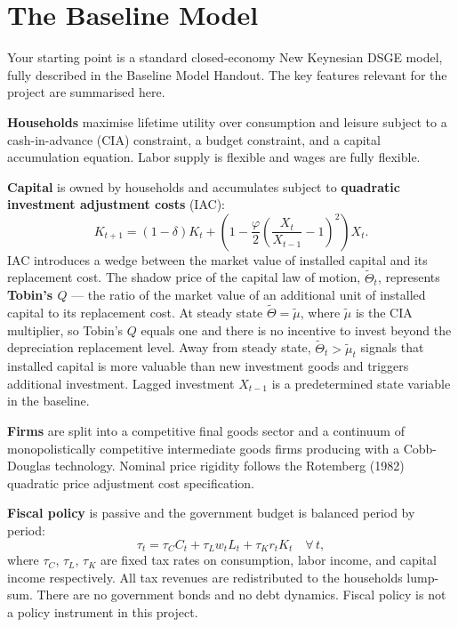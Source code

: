 \documentclass[11pt, a4paper]{article}
\begin{document}
\section{The Baseline Model}

Your starting point is a standard closed-economy New Keynesian DSGE model, fully
described in the Baseline Model Handout. The key features relevant for the
project are summarised here.

\textbf{Households} maximise lifetime utility over consumption and leisure
subject to a cash-in-advance (CIA) constraint, a budget constraint, and a
capital accumulation equation. Labor supply is flexible and wages are fully
flexible.

\textbf{Capital} is owned by households and accumulates subject to
\textbf{quadratic investment adjustment costs} (IAC):
\[
    K_{t+1} = (1-\delta)K_t
    + \left(1 - \frac{\varphi}{2}\left(\frac{X_t}{X_{t-1}}-1\right)^2\right)X_t.
\]
IAC introduces a wedge between the market value of installed capital and its
replacement cost. The shadow price of the capital law of motion, $\tilde{\Theta}_t$,
represents \textbf{Tobin's $Q$} --- the ratio of the market value of an
additional unit of installed capital to its replacement cost. At steady state
$\tilde{\Theta} = \tilde{\mu}$, where $\tilde{\mu}$ is the CIA multiplier, so
Tobin's $Q$ equals one and there is no incentive to invest beyond the
depreciation replacement level. Away from steady state, $\tilde{\Theta}_t >
\tilde{\mu}_t$ signals that installed capital is more valuable than new
investment goods and triggers additional investment. Lagged investment
$X_{t-1}$ is a predetermined state variable in the baseline.

\textbf{Firms} are split into a competitive final goods sector and a continuum
of monopolistically competitive intermediate goods firms producing with a
Cobb-Douglas technology. Nominal price rigidity follows the Rotemberg (1982)
quadratic price adjustment cost specification.

\textbf{Fiscal policy} is passive and the government budget is balanced period
by period:
\[
    \tau_t = \tau_C C_t + \tau_L w_t L_t + \tau_K r_t K_t \quad \forall\,t,
\]
where $\tau_C$, $\tau_L$, $\tau_K$ are fixed tax rates on consumption, labor
income, and capital income respectively. All tax revenues are redistributed 
to the households lump-sum. There are no government bonds and no
debt dynamics. Fiscal policy is not a policy instrument in this project.
\end{document}
